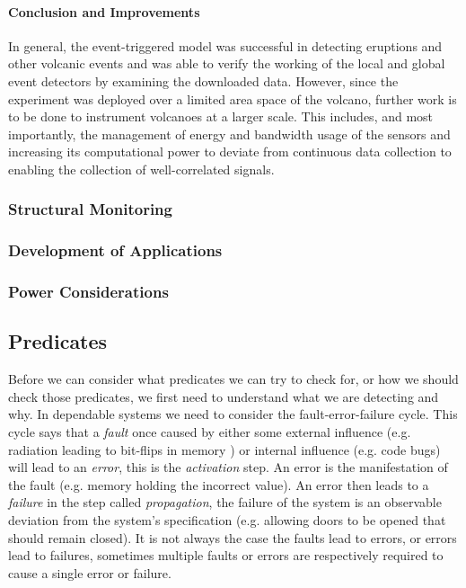 \paragraph{Conclusion and Improvements}

In general, the event-triggered model was successful in detecting eruptions and other volcanic events and was able to verify the working of the local and global event detectors by examining the downloaded data. However, since the experiment was deployed over a limited area space of the volcano, further work is to be done to instrument volcanoes at a larger scale. This includes, and most importantly, the management of energy and bandwidth usage of the sensors and increasing its computational power to deviate from continuous data collection to enabling the collection of well-correlated signals. 

\subsubsection*{Structural Monitoring}
\cite{5508230}

\subsubsection*{Development of Applications}
\cite{Fagerstrom:1988:DTD:55823.55833}


\subsubsection*{Power Considerations}


\subsection{Predicates}

Before we can consider what predicates we can try to check for, or how we should check those predicates, we first need to understand what we are detecting and why. In dependable systems we need to consider the fault-error-failure cycle. This cycle says that a \emph{fault} once caused by either some external influence (e.g. radiation leading to bit-flips in memory \cite{?}) or internal influence (e.g. code bugs) will lead to an \emph{error}, this is the \emph{activation} step. An error is the manifestation of the fault (e.g. memory holding the incorrect value). An error then leads to a \emph{failure} in the step called \emph{propagation}, the failure of the system is an observable deviation from the system's specification (e.g. allowing doors to be opened that should remain closed). It is not always the case the faults lead to errors, or errors lead to failures, sometimes multiple faults or errors are respectively required to cause a single error or failure. \cite{1335465}

